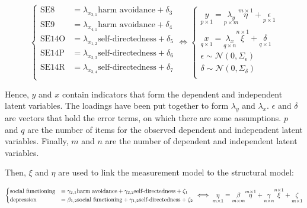 \documentclass[11pt]{article}
\begin{document}
\begin{equation}
\begin{cases}
    \textrm{SE8}   & = \lambda_{x_{3,1}} \textrm{harm avoidance}     + \delta_3 \\
    \textrm{SE9}   & = \lambda_{x_{4,1}} \textrm{harm avoidance}     + \delta_4 \\
    \textrm{SE14O} & = \lambda_{x_{1,2}} \textrm{self-directedness}  + \delta_5 \\
    \textrm{SE14P} & = \lambda_{x_{2,3}} \textrm{self-directedness}  + \delta_6 \\
    \textrm{SE14R} & = \lambda_{x_{3,4}} \textrm{self-directedness}  + \delta_7 \\
  \end{cases}
  \iff
  \begin{cases}
    \underset{p \times 1}{y} = \underset{p \times m}{\lambda_y} \overset{m \times 1}{\eta} + \underset{p \times 1}{\epsilon} \\
    \underset{q \times 1}{x} = \underset{q \times n}{\lambda_x} \overset{n \times 1}{\xi}  + \underset{q \times 1}{\delta} \\
    \epsilon \sim \mathcal{N}(0, \Sigma_\epsilon) \\
    \delta \sim \mathcal{N}(0, \Sigma_\delta) \\
  \end{cases}
\end{equation}

Hence, $y$ and $x$ contain indicators that form the dependent and independent
latent variables. The loadings have been put together to form $\lambda_y$ and
$\lambda_x$. $\epsilon$ and $\delta$ are vectors that hold the error terms, on
which there are some assumptions. $p$ and $q$ are the number of items for the
observed dependent and independent latent variables. Finally, $m$ and $n$ are
the number of dependent and independent latent variables.

Then, $\xi$ and $\eta$ are used to link the measurement model to the structural
model:

\begin{equation}
  \small
  \label{eq:structural_model}
  \begin{cases}
    \textrm{social functioning} & = \gamma_{2,1} \textrm{harm avoidance}     + \gamma_{2,2} \textrm{self-directedness} + \zeta_1 \\
    \textrm{depression}         & = \beta_{1,2}  \textrm{social functioning} + \gamma_{1,2} \textrm{self-directedness} + \zeta_2 \\
  \end{cases}
  \iff
    \underset{m \times 1}{\eta} = \underset{m \times m}{\beta} \overset{m \times 1}{\eta}
                                  + \underset{n \times n}{\gamma} \overset{n \times 1}{\xi}
                                  + \underset{m \times 1}{\zeta} \\
\end{equation}
\end{document}
